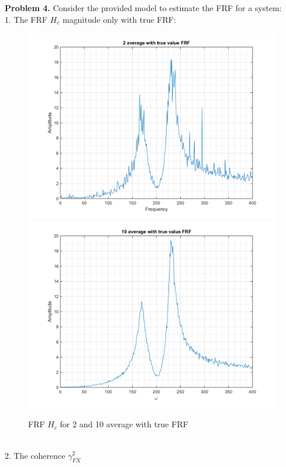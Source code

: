 \documentclass[14pt,a4paper]{article}
\begin{document}
\textbf{Problem 4.} Consider the provided model to estimate the FRF for a system:\\
1. The FRF $H_c$ magnitude only with true FRF:
\begin{figure}[htp]
	\centering
	\includegraphics[scale=0.4]{fn4_VB1_1.png}
	\includegraphics[scale=0.4]{fn4_VB1_2.png}
	\caption{FRF $H_c$ for 2 and 10 average with true FRF}
\end{figure}\\
2. The coherence $\gamma_{FX}^2$
\end{document}
